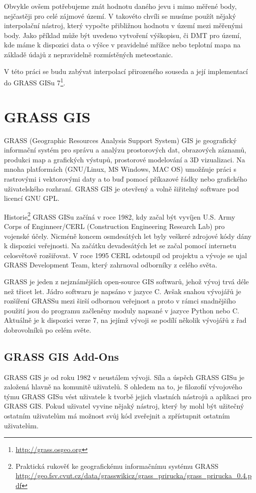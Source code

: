 \documentclass[12pt,a4paper]{article}
\begin{document}
Obvykle ovšem potřebujeme znát hodnotu daného jevu i mimo měřené body, nejčastěji pro celé zájmové území. V takovéto chvíli se musíme použít nějaký interpolační nástroj, který vypočte přibližnou hodnotu v území mezi měřenými body. Jako příklad může být uvedeno vytvoření výškopisu, či DMT pro území, kde máme k dispozici data o výšce v pravidelné mřížce nebo teplotní mapa na základě údajů z nepravidelně rozmístěných meteostanic.

V této práci se budu zabývat interpolací přirozeného souseda a její implementací do GRASS GISu 7\footnote{\url{http://grass.osgeo.org}}. 


\newpage
\section{GRASS GIS}
GRASS (Geographic Resources Analysis Support System) GIS je geografický informační systém pro správu a analýzu prostorových dat, obrazových záznamů, produkci map a grafických výstupů, prostorové modelování a 3D vizualizaci. Na mnoha platformách (GNU/Linux, MS Windows, MAC OS) umožňuje práci s rastrovými i vektorovými daty a to buď pomocí příkazové řádky nebo grafického uživatelského rozhraní. GRASS GIS je otevřený a volně šiřitelný software pod licencí GNU GPL.

Historie\footnote{Praktická rukověť ke geografickému informačnímu systému GRASS \url{http://geo.fsv.cvut.cz/data/grasswikicz/grass_prirucka/grass_prirucka_0.4.pdf}} GRASS GISu začíná v roce 1982, kdy začal být vyvíjen U.S. Army Corps of Enginneer/CERL (Construction Engineering Research Lab) pro vojenské účely. Nicméně koncem osmdesátých let byly veškeré zdrojové kódy dány k dispozici veřejnosti. Na začátku devadesátých let se začal pomocí internetu celosvětově rozšiřovat. V roce 1995 CERL odstoupil od projektu a vývoje se ujal GRASS Development Team, který zahrnoval odborníky z celého světa.

GRASS je jeden z nejznámějších open-source GIS softwarů, jehož vývoj trvá déle než třicet let. Jádro softwaru je napsáno v jazyce C. Avšak snahou vývojářů je rozšíření GRASSu mezi širší odbornou veřejnost a proto v rámci snadnějšího použití jsou do programu začleněny moduly napsané v jazyce Python nebo C. Aktuálně je k dispozici verze 7, na jejímž vývoji se podílí několik vývojářů z řad dobrovolníků po celém světe.

\subsection{GRASS GIS Add-Ons}
GRASS GIS je od roku 1982 v neustálem vývoji. Síla a úspěch GRASS GISu je založená hlavně na komunitě uživatelů. S ohledem na to, je filozofií vývojového týmu GRASS GISu vést uživatele k tvorbě jejich vlastních nástrojů a aplikaci pro GRASS GIS. Pokud uživatel vyvine nějaký nástroj, který by mohl být užitečný ostatním uživatelům má možnost svůj kód zveřejnit a zpřístupnit ostatním uživatelům.
\end{document}
